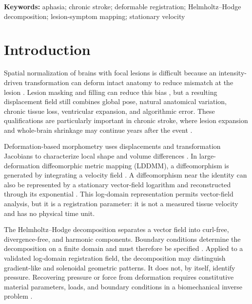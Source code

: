 \documentclass[11pt]{article}
\begin{document}
\noindent\textbf{Keywords:} aphasia; chronic stroke; deformable registration;
Helmholtz--Hodge decomposition; lesion-symptom mapping; stationary velocity

\section{Introduction}

Spatial normalization of brains with focal lesions is difficult because an
intensity-driven transformation can deform intact anatomy to reduce mismatch at
the lesion \citep{Brett2001,Andersen2010}. Lesion masking and filling can reduce
this bias \citep{Sdika2009}, but a resulting displacement field still combines
global pose, natural anatomical variation, chronic tissue loss, ventricular
expansion, and algorithmic error. These qualifications are particularly
important in chronic stroke, where lesion expansion and whole-brain shrinkage
may continue years after the event \citep{Seghier2014}.

Deformation-based morphometry uses displacements and transformation Jacobians
to characterize local shape and volume differences \citep{Chung2001}. In
large-deformation diffeomorphic metric mapping (LDDMM), a diffeomorphism is
generated by integrating a velocity field \citep{Beg2005}. A diffeomorphism
near the identity can also be represented by a stationary vector-field
logarithm and reconstructed through its exponential
\citep{Arsigny2006,Vercauteren2009}. This log-domain representation permits
vector-field analysis, but it is a registration parameter: it is not a measured
tissue velocity and has no physical time unit.

The Helmholtz--Hodge decomposition separates a vector field into curl-free,
divergence-free, and harmonic components. Boundary conditions determine the
decomposition on a finite domain and must therefore be specified
\citep{Bhatia2013}. Applied to a validated log-domain registration field, the
decomposition may distinguish gradient-like and solenoidal geometric patterns.
It does not, by itself, identify pressure. Recovering pressure or force from
deformation requires constitutive material parameters, loads, and boundary
conditions in a biomechanical inverse problem \citep{Hogea2008}.
\end{document}
